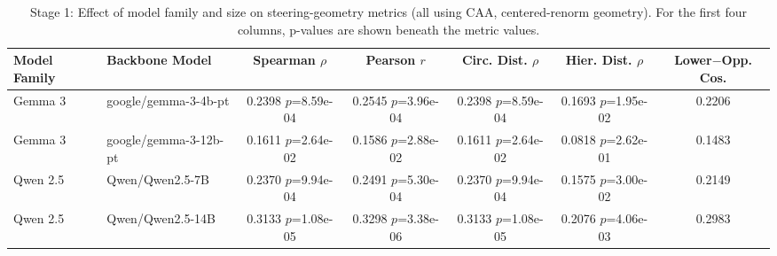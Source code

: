 \begin{table}[ht]
    \centering
    \caption{Stage 1: Effect of model family and size on steering-geometry metrics (all using CAA, centered-renorm geometry). For the first four columns, p-values are shown beneath the metric values.}
    \label{tab:stage1_geometry}
    \setlength{\tabcolsep}{6pt}
    \renewcommand{\arraystretch}{1.15}
    \small
    \begin{tabular}{ll c c c c c}
        \toprule
        \textbf{Model Family} & \textbf{Backbone Model} & \textbf{Spearman $\rho$} & \textbf{Pearson $r$} & \textbf{Circ. Dist. $\rho$} & \textbf{Hier. Dist. $\rho$} & \textbf{Lower$-$Opp. Cos.} \\
        \midrule
        Gemma 3 & google/gemma-3-4b-pt & \shortstack{0.2398\\{\scriptsize $p$=8.59e-04}} & \shortstack{0.2545\\{\scriptsize $p$=3.96e-04}} & \shortstack{0.2398\\{\scriptsize $p$=8.59e-04}} & \shortstack{0.1693\\{\scriptsize $p$=1.95e-02}} & 0.2206 \\
        Gemma 3 & google/gemma-3-12b-pt & \shortstack{0.1611\\{\scriptsize $p$=2.64e-02}} & \shortstack{0.1586\\{\scriptsize $p$=2.88e-02}} & \shortstack{0.1611\\{\scriptsize $p$=2.64e-02}} & \shortstack{0.0818\\{\scriptsize $p$=2.62e-01}} & 0.1483 \\
        \midrule
        Qwen 2.5 & Qwen/Qwen2.5-7B & \shortstack{0.2370\\{\scriptsize $p$=9.94e-04}} & \shortstack{0.2491\\{\scriptsize $p$=5.30e-04}} & \shortstack{0.2370\\{\scriptsize $p$=9.94e-04}} & \shortstack{0.1575\\{\scriptsize $p$=3.00e-02}} & 0.2149 \\
        Qwen 2.5 & Qwen/Qwen2.5-14B & \shortstack{0.3133\\{\scriptsize $p$=1.08e-05}} & \shortstack{0.3298\\{\scriptsize $p$=3.38e-06}} & \shortstack{0.3133\\{\scriptsize $p$=1.08e-05}} & \shortstack{0.2076\\{\scriptsize $p$=4.06e-03}} & 0.2983 \\

\end{tabular}
\end{table}
